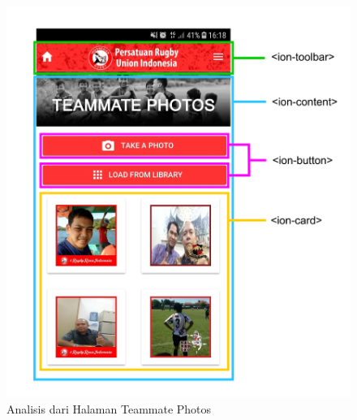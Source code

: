 \begin{figure} [H]
    \centering
    \includegraphics[scale=0.1]{Gambar/teammates_photos-analytics.png}
    \caption{Analisis dari Halaman Teammate Photos}
    \label{fig:teammate-photos-analytics}
\end{figure}





